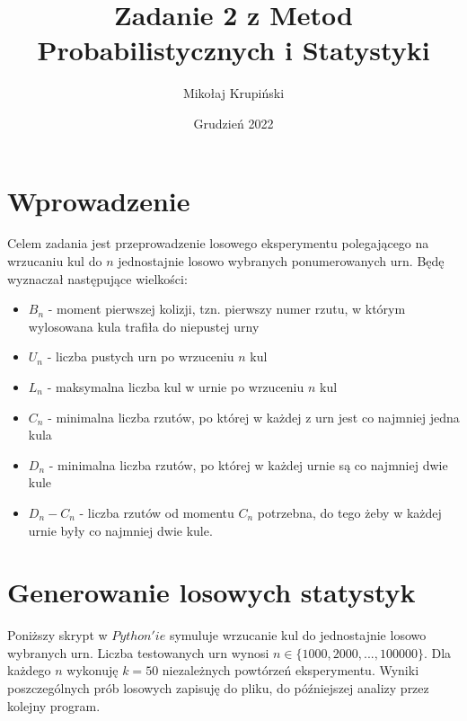 \documentclass[12pt]{article}
\title{Zadanie 2 z Metod Probabilistycznych i Statystyki}
\author{Mikołaj Krupiński}
\date{Grudzień 2022}
\begin{document}
\maketitle

\section{Wprowadzenie}
Celem zadania jest przeprowadzenie losowego eksperymentu polegającego na wrzucaniu kul do $n$ jednostajnie losowo wybranych ponumerowanych urn. Będę wyznaczał następujące wielkości:
\begin{itemize}
    \item $B_n$ - moment pierwszej kolizji, tzn. pierwszy numer rzutu, w którym wylosowana kula trafiła do niepustej urny
    \item $U_n$ - liczba pustych urn po wrzuceniu $n$ kul
    \item $L_n$ - maksymalna liczba kul w urnie po wrzuceniu $n$ kul
    \item $C_n$ - minimalna liczba rzutów, po której w każdej z urn jest co najmniej jedna kula
    \item $D_n$ - minimalna liczba rzutów, po której w każdej urnie są co najmniej dwie kule
    \item $D_n - C_n$ - liczba rzutów od momentu $C_n$ potrzebna, do tego żeby w każdej urnie były co najmniej dwie kule.
\end{itemize}

\section{Generowanie losowych statystyk}

Poniższy skrypt w $Python'ie$ symuluje wrzucanie kul do jednostajnie losowo wybranych urn. Liczba testowanych urn wynosi $n \in \{1000, 2000, ..., 100000\}$. Dla każdego $n$ wykonuję $k=50$ niezależnych powtórzeń eksperymentu. Wyniki poszczególnych prób losowych zapisuję do pliku, do późniejszej analizy przez kolejny program.
\end{document}
